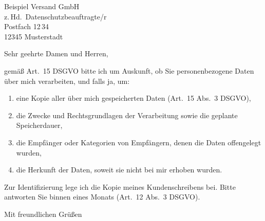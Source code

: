 



\begin{letter}{%
    Beispiel Versand GmbH\\
    z.\,Hd.\ Datenschutzbeauftragte/r\\
    Postfach 12\,34\\
    12345 Musterstadt%
  }

  \opening{Sehr geehrte Damen und Herren,}

  gemäß Art.~15 DSGVO bitte ich um Auskunft, ob Sie personenbezogene Daten über mich verarbeiten, und falls ja, um:
  \begin{enumerate}
    \item eine Kopie aller über mich gespeicherten Daten (Art.~15 Abs.~3 DSGVO),
    \item die Zwecke und Rechtsgrundlagen der Verarbeitung sowie die geplante Speicherdauer,
    \item die Empfänger oder Kategorien von Empfängern, denen die Daten offengelegt wurden,
    \item die Herkunft der Daten, soweit sie nicht bei mir erhoben wurden.
  \end{enumerate}

  Zur Identifizierung lege ich die Kopie meines Kundenschreibens bei. Bitte antworten Sie binnen eines Monats (Art.~12 Abs.~3 DSGVO).

  \closing{Mit freundlichen Grüßen}

\end{letter}



